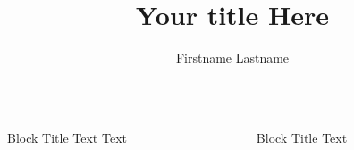 \documentclass[final,hyperref={pdfpagelabels=false}]{beamer}
\title{Your title Here}
\author{Firstname Lastname}
\begin{document}
\begin{frame}{}
\begin{columns}[T] %
\begin{column}{.43\paperwidth} %

\begin{block}{Block Title}
Text
Text
\end{block}


\end{column}
\begin{column}{.43\paperwidth} %

\begin{block}{Block Title}
Text
\end{block}


\end{column}
\end{columns}
\end{frame}
\end{document}
